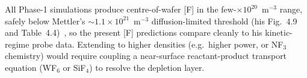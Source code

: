 %

\item[\textsc{L5.\ Kinetic-regime chemistry only.}] All Phase-1 simulations
produce centre-of-wafer [F] in the few-$\times 10^{20}$~m$^{-3}$ range, safely
below Mettler's $\sim 1.1 \times 10^{21}$~m$^{-3}$ diffusion-limited threshold
(his Fig.~4.9 and Table~4.4)~\cite{Mettler2025}, so the present [F] predictions
compare cleanly to his kinetic-regime probe data.  Extending to higher
densities (e.g.\ higher power, or NF$_3$ chemistry) would require coupling a
near-surface reactant-product transport equation (WF$_6$ or SiF$_4$) to
resolve the depletion layer.

%
%
%
